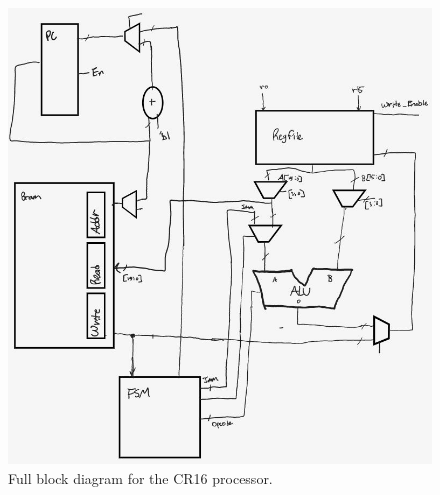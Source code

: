 \documentclass[conference]{IEEEtran}
\begin{document}
\begin{figure}
    \centering
    \includegraphics[scale=0.55]{resources/figures/full_bd.jpg}
    \caption{Full block diagram for the CR16 processor.}
    \label{fig:full_bd}
\end{figure}
\end{document}
